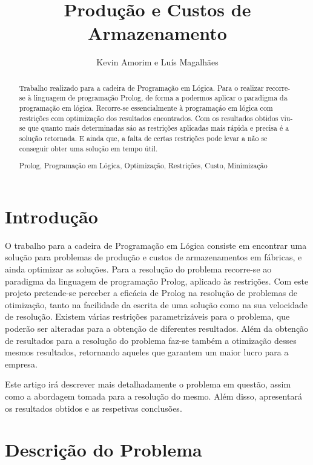\documentclass[runningheads,a4paper]{llncs}
\newcommand{\keywords}[1]{\par\addvspace\baselineskip
\noindent\keywordname\enspace\ignorespaces#1}
\begin{document}
\mainmatter 

\title{Produção e Custos de Armazenamento}
\author{Kevin Amorim e Luís Magalhães}
\maketitle


\begin{abstract}

Trabalho realizado para a cadeira de Programação em Lógica. Para o realizar recorre-se à linguagem de programação Prolog, de forma a podermos aplicar o paradigma da programação em lógica. Recorre-se essencialmente à programaçáo em lógica com restrições com optimização dos resultados encontrados. Com os resultados obtidos viu-se que quanto mais determinadas sáo as restrições aplicadas mais rápida e precisa é a solução retornada. E ainda que, a falta de certas restrições pode levar a não se conseguir obter uma solução em tempo útil.

\keywords{ Prolog, Programação em Lógica, Optimização, Restrições, Custo, Minimização}
\end{abstract}


\section{Introdução}

O trabalho para a cadeira de Programação em Lógica consiste em encontrar uma solução para problemas de produção e custos de armazenamentos em fábricas, e ainda optimizar as soluções. Para a resolução do problema recorre-se ao paradigma da linguagem de programação Prolog, aplicado às restrições. Com este projeto pretende-se perceber a eficácia de Prolog na resolução de problemas de otimização, tanto na facilidade da escrita de uma solução como na sua velocidade de resolução. Existem várias restrições parametrizáveis para o problema, que poderão ser alteradas para a obtenção de diferentes resultados. Além da obtenção de resultados para a resolução do problema faz-se também a otimização desses mesmos resultados, retornando aqueles que garantem um maior lucro para a empresa. 

Este artigo irá descrever mais detalhadamente o problema em questão, assim como a abordagem tomada para a resolução do mesmo. Além disso, apresentará os resultados obtidos e as respetivas conclusões. 

\section{Descrição do Problema}
\end{document}
